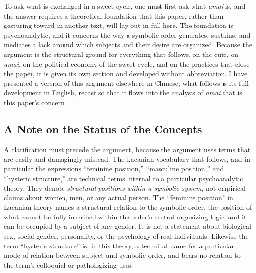 To ask what is exchanged in a sweet cycle, one must first ask what \textit{amai} is, and the answer requires a theoretical foundation that this paper, rather than gesturing toward in another text, will lay out in full here. The foundation is psychoanalytic, and it concerns the way a symbolic order generates, sustains, and mediates a lack around which subjects and their desire are organized. Because the argument is the structural ground for everything that follows, on the cute, on \textit{amai}, on the political economy of the sweet cycle, and on the practices that close the paper, it is given its own section and developed without abbreviation. I have presented a version of this argument elsewhere in Chinese; what follows is its full development in English, recast so that it flows into the analysis of \textit{amai} that is this paper's concern.

\subsection{A Note on the Status of the Concepts}

A clarification must precede the argument, because the argument uses terms that are easily and damagingly misread. The Lacanian vocabulary that follows, and in particular the expressions ``feminine position,'' ``masculine position,'' and ``hysteric structure,'' are technical terms internal to a particular psychoanalytic theory. They denote \textit{structural positions within a symbolic system}, not empirical claims about women, men, or any actual person. The ``feminine position'' in Lacanian theory names a structural relation to the symbolic order, the position of what cannot be fully inscribed within the order's central organizing logic, and it can be occupied by a subject of any gender. It is not a statement about biological sex, social gender, personality, or the psychology of real individuals. Likewise the term ``hysteric structure'' is, in this theory, a technical name for a particular mode of relation between subject and symbolic order, and bears no relation to the term's colloquial or pathologizing uses.

